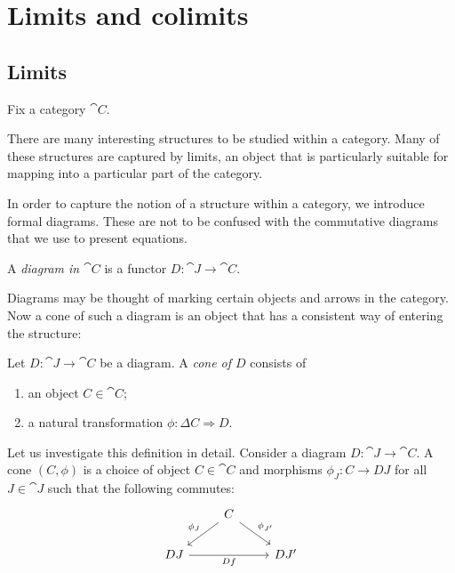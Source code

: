 \documentclass{article}
\begin{document}
\section{Limits and colimits}

\subsection{Limits}

Fix a category $\cat{C}$.

There are many interesting structures to be studied within a category. Many of these
structures are captured by limits, an object that is particularly suitable
for mapping into a particular part of the category.

In order to capture the notion of a structure within a category, we introduce
formal diagrams. These are not to be confused with the commutative diagrams that
we use to present equations.

\begin{definition}
  A \emph{diagram in $\cat{C}$} is a functor $D:\cat{J}\to\cat{C}$.
\end{definition}

Diagrams may be thought of marking certain objects and arrows in the category.
Now a cone of such a diagram is an object that has a consistent way of entering
the structure:

\begin{definition}
  Let $D:\cat{J}\to\cat{C}$ be a diagram. A \emph{cone of $D$} consists of
  \begin{enumerate}
    \item an object $C\in\cat{C}$;
    \item a natural transformation $\phi:\Delta C\Rightarrow D$.
  \end{enumerate}
\end{definition}

Let us investigate this definition in detail. Consider a diagram
$D:\cat{J}\to\cat{C}$. A cone $(C,\phi)$ is a choice of object $C\in\cat{C}$
and morphisms $\phi_J:C\to DJ$ for all $J\in\cat{J}$ such that the following
commutes:
\begin{equation}
  \begin{tikzcd}
  & C \\
    DJ && {DJ'}
    \arrow["Df"', from=2-1, to=2-3]
    \arrow["{\phi_{J'}}", from=1-2, to=2-3]
    \arrow["{\phi_J}"', from=1-2, to=2-1]
  \end{tikzcd}
\end{equation}
\end{document}
